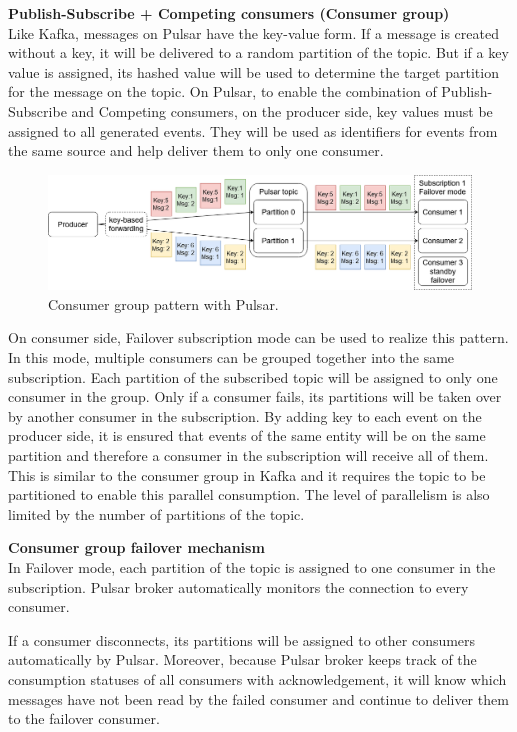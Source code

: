 \textbf{Publish-Subscribe + Competing consumers (Consumer group)}\\
Like Kafka, messages on Pulsar have the key-value form. If a message is created without a key, it will be delivered to a random partition of the topic. But if a key value is assigned, its hashed value will be used to determine the target partition for the message on the topic. On Pulsar, to enable the combination of Publish-Subscribe and Competing consumers, on the producer side, key values must be assigned to all generated events. They will be used as identifiers for events from the same source and help deliver them to only one consumer.

\begin{figure}[h]
	\centering
	\includegraphics[width=\linewidth]{images/consumer-group-pulsar.png}
	\caption{Consumer group pattern with Pulsar.}
	\label{fig:pulsarconsumergroup}
\end{figure}

On consumer side, Failover subscription mode can be used to realize this pattern. In this mode, multiple consumers can be grouped together into the same subscription. Each partition of the subscribed topic will be assigned to only one consumer in the group. Only if a consumer fails, its partitions will be taken over by another consumer in the subscription. By adding key to each event on the producer side, it is ensured that events of the same entity will be on the same partition and therefore a consumer in the subscription will receive all of them. This is similar to the consumer group in Kafka and it requires the topic to be partitioned to enable this parallel consumption. The level of parallelism is also limited by the number of partitions of the topic. 



\textbf{Consumer group failover mechanism}\\
In Failover mode, each partition of the topic is assigned to one consumer in the subscription. Pulsar broker automatically monitors the connection to every consumer. 

If a consumer disconnects, its partitions will be assigned to other consumers automatically by Pulsar. Moreover, because Pulsar broker keeps track of the consumption statuses of all consumers with acknowledgement, it will know which messages have not been read by the failed consumer and continue to deliver them to the failover consumer.

